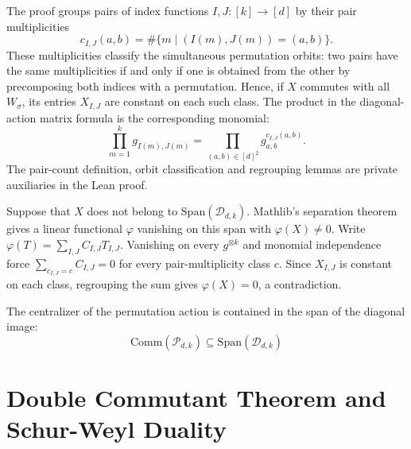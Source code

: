 {\chat
The proof groups pairs of index functions $I,J:[k]\to[d]$ by their
pair multiplicities
\[
  c_{I,J}(a,b)=\#\{m\mid (I(m),J(m))=(a,b)\}.
\]
These multiplicities classify the simultaneous permutation orbits: two pairs
have the same multiplicities if and only if one is obtained from the other by
precomposing both indices with a permutation. Hence, if $X$ commutes with all
$W_\sigma$, its entries $X_{I,J}$ are constant on each such class. The product
in the diagonal-action matrix formula is the corresponding monomial:
\[
  \prod_{m=1}^k g_{I(m),J(m)}
    =\prod_{(a,b)\in[d]^2}g_{a,b}^{c_{I,J}(a,b)}.
\]
The pair-count definition, orbit classification and regrouping lemmas are
private auxiliaries in the Lean proof.

Suppose that $X$ does not belong to $\text{Span}(\mathcal{D}_{d,k})$.
Mathlib's separation theorem gives a linear
functional $\varphi$ vanishing on this span with $\varphi(X)\ne0$.
Write $\varphi(T)=\sum_{I,J}C_{I,J}T_{I,J}$. Vanishing on every
$g^{\otimes k}$ and monomial independence force
$\sum_{c_{I,J}=c}C_{I,J}=0$ for every pair-multiplicity class $c$.
Since $X_{I,J}$ is constant on each class, regrouping the sum gives
$\varphi(X)=0$, a contradiction.
} %

{\chat
\begin{theorem}\label{thm:centralizer_permImage_le_span_diagImage}
  \leanok
  The centralizer of the permutation action is contained in the span of the diagonal image:
  \begin{equation}
    \text{Comm}(\mathcal{P}_{d,k}) \subseteq \text{Span}(\mathcal{D}_{d,k})
  \end{equation}
\end{theorem}
} %


\section{Double Commutant Theorem and Schur-Weyl Duality}

